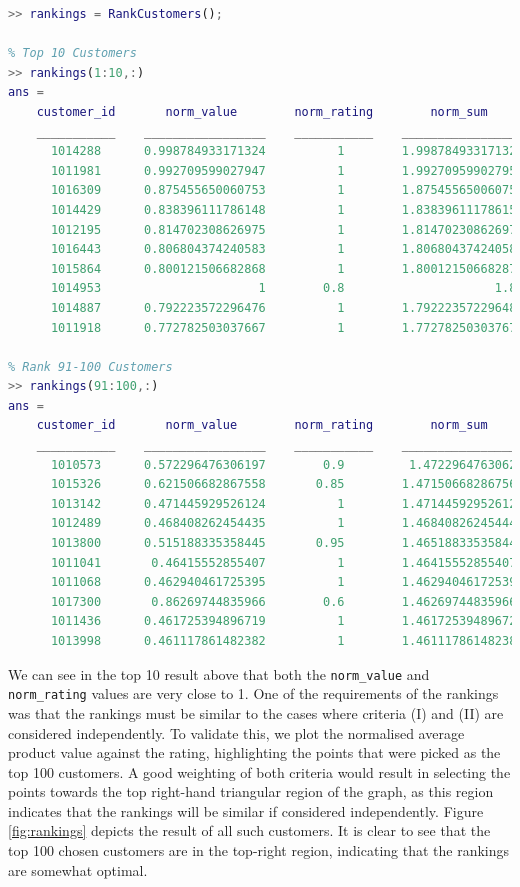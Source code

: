 \documentclass[11pt]{report}
\begin{document}
\begin{lstlisting}[title={Rankings of customers calculated by \texttt{RankCustomers()}.}, language=MATLAB]
>> rankings = RankCustomers();

% Top 10 Customers
>> rankings(1:10,:)
ans =
    customer_id       norm_value        norm_rating        norm_sum    
    ___________    _________________    ___________    ________________
      1014288      0.998784933171324          1        1.99878493317132
      1011981      0.992709599027947          1        1.99270959902795
      1016309      0.875455650060753          1        1.87545565006075
      1014429      0.838396111786148          1        1.83839611178615
      1012195      0.814702308626975          1        1.81470230862697
      1016443      0.806804374240583          1        1.80680437424058
      1015864      0.800121506682868          1        1.80012150668287
      1014953                      1        0.8                     1.8
      1014887      0.792223572296476          1        1.79222357229648
      1011918      0.772782503037667          1        1.77278250303767

% Rank 91-100 Customers
>> rankings(91:100,:)
ans =
    customer_id       norm_value        norm_rating        norm_sum    
    ___________    _________________    ___________    ________________
      1010573      0.572296476306197        0.9         1.4722964763062
      1015326      0.621506682867558       0.85        1.47150668286756
      1013142      0.471445929526124          1        1.47144592952612
      1012489      0.468408262454435          1        1.46840826245444
      1013800      0.515188335358445       0.95        1.46518833535844
      1011041       0.46415552855407          1        1.46415552855407
      1011068      0.462940461725395          1        1.46294046172539
      1017300       0.86269744835966        0.6        1.46269744835966
      1011436      0.461725394896719          1        1.46172539489672
      1013998      0.461117861482382          1        1.46111786148238
\end{lstlisting}


We can see in the top 10 result above that both the \texttt{norm\_value} and \texttt{norm\_rating} values are very close to 1. One of the requirements of the rankings was that the rankings must be similar to the cases where criteria (I) and (II) are considered independently. To validate this, we plot the normalised average product value against the rating, highlighting the points that were picked as the top 100 customers. A good weighting of both criteria would result in selecting the points towards the top right-hand triangular region of the graph, as this region indicates that the rankings will be similar if considered independently. Figure \ref{fig:rankings} depicts the result of all such customers. It is clear to see that the top 100 chosen customers are in the top-right region, indicating that the rankings are somewhat optimal.
\end{document}
